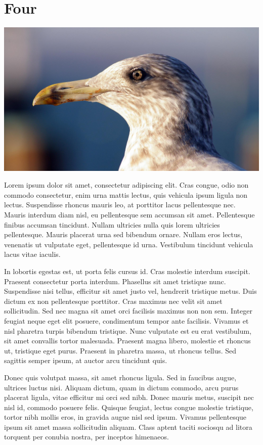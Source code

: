 \section{Four}

\includegraphics[width=\textwidth]{figures/5.jpg}

Lorem ipsum dolor sit amet, consectetur adipiscing elit. Cras congue, odio non commodo consectetur, enim urna mattis lectus, quis vehicula ipsum ligula non lectus. Suspendisse rhoncus mauris leo, at porttitor lacus pellentesque nec. Mauris interdum diam nisl, eu pellentesque sem accumsan sit amet. Pellentesque finibus accumsan tincidunt. Nullam ultricies nulla quis lorem ultricies pellentesque. Mauris placerat urna sed bibendum ornare. Nullam eros lectus, venenatis ut vulputate eget, pellentesque id urna. Vestibulum tincidunt vehicula lacus vitae iaculis.

In lobortis egestas est, ut porta felis cursus id. Cras molestie interdum suscipit. Praesent consectetur porta interdum. Phasellus sit amet tristique nunc. Suspendisse nisi tellus, efficitur sit amet justo vel, hendrerit tristique metus. Duis dictum ex non pellentesque porttitor. Cras maximus nec velit sit amet sollicitudin. Sed nec magna sit amet orci facilisis maximus non non sem. Integer feugiat neque eget elit posuere, condimentum tempor ante facilisis. Vivamus et nisl pharetra turpis bibendum tristique. Nunc vulputate est eu erat vestibulum, sit amet convallis tortor malesuada. Praesent magna libero, molestie et rhoncus ut, tristique eget purus. Praesent in pharetra massa, ut rhoncus tellus. Sed sagittis semper ipsum, at auctor arcu tincidunt quis.

Donec quis volutpat massa, sit amet rhoncus ligula. Sed in faucibus augue, ultrices luctus nisi. Aliquam dictum, quam in dictum commodo, arcu purus placerat ligula, vitae efficitur mi orci sed nibh. Donec mauris metus, suscipit nec nisl id, commodo posuere felis. Quisque feugiat, lectus congue molestie tristique, tortor nibh mollis eros, in gravida augue nisl sed ipsum. Vivamus pellentesque ipsum sit amet massa sollicitudin aliquam. Class aptent taciti sociosqu ad litora torquent per conubia nostra, per inceptos himenaeos.

